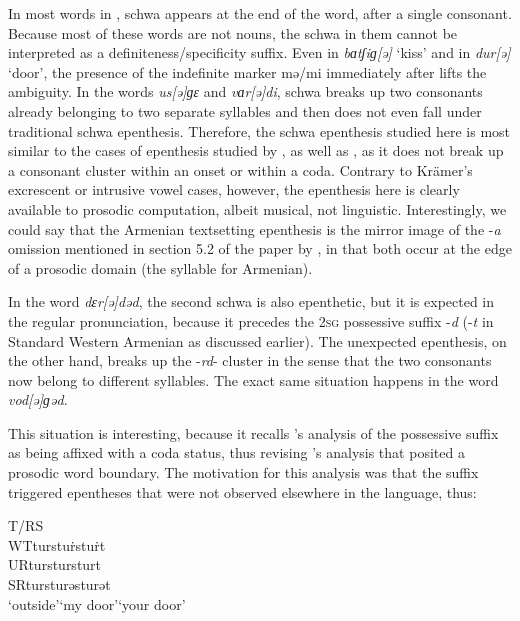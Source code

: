 \documentclass[output=paper,colorlinks,citecolor=brown]{langscibook}
\begin{document}
In most words in , schwa appears at the end of the word, after a single consonant.  Because most of these words are not nouns, the schwa in them cannot be interpreted as a definiteness\slash specificity suffix.  Even in \textit{bɑtʃiɡ[ə]} ‘kiss’ and in \textit{dur[ə]} ‘door’, the presence of the indefinite marker mə/mi immediately after lifts the ambiguity.  In the words \textit{us[ə]ɡɛ} and \textit{vɑr[ə]di}, schwa breaks up two consonants already belonging to two separate syllables and then does not even fall under traditional schwa epenthesis.  Therefore, the schwa epenthesis studied here is most similar to the cases of epenthesis studied by , as well as , as it does not break up a consonant cluster within an onset or within a coda.  Contrary to Krämer’s excrescent or intrusive vowel cases, however, the epenthesis here is clearly available to prosodic computation, albeit musical, not linguistic.  Interestingly, we could say that the Armenian textsetting epenthesis is the mirror image of the -\textit{a} omission mentioned in section 5.2 of the paper by , in that both occur at the edge of a prosodic domain (the syllable for Armenian).


In the word \textit{dɛr[ə]dəd}, the second schwa is also epenthetic, but it is expected in the regular pronunciation, because it precedes the 2\textsc{sg} possessive suffix -\textit{d} (-\textit{t} in Standard Western Armenian as discussed earlier).  The unexpected epenthesis, on the other hand, breaks up the -\textit{rd}- cluster in the sense that the two consonants now belong to different syllables.  The exact same situation happens in the word \textit{vod[ə]ɡəd}.  

  This situation is interesting, because it recalls \citet{Baronian2017}'s analysis of the possessive suffix as being affixed with a coda status, thus revising \citet{Vaux1998}'s analysis that posited a prosodic word boundary.  The motivation for this analysis was that the suffix triggered epentheses that were not observed elsewhere in the language, thus:

\begin{exe}
    \ex \label{baronian:ex13} T/RS\tab 	{}\tab 		{}\tab 		{}\\
	WT\tab 	turs\tab 		tuṙs\tab 		tuṙt\\
    UR\tab 	turs\tab 		turs\tab 		turt\\
    SR\tab 	turs\tab 		turəs\tab 		turət\\
    \tab \tab ‘outside’\tab 	‘my door’\tab 	‘your door’
\end{exe}
\end{document}
